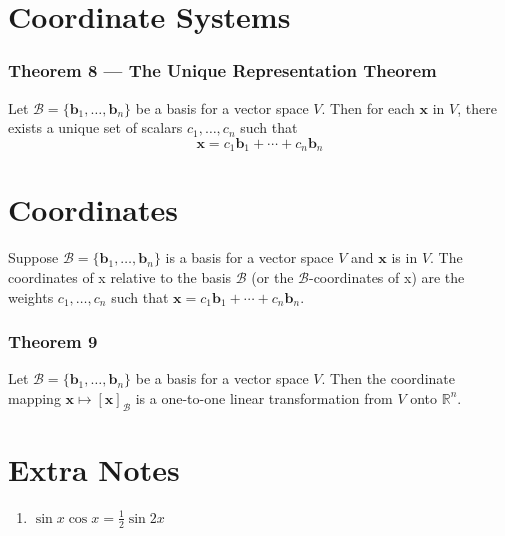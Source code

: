 \documentclass{article}
\begin{document}
\section*{Coordinate Systems}
\subsubsection*{Theorem 8 --- The Unique Representation Theorem}
Let $\mathcal{B}=\{\mathbf{b}_1, \ldots, \mathbf{b}_n\}$ be a basis for a vector space $V$. Then for each $\mathbf{x}$ in $V$, there exists a unique set of scalars $c_1, \ldots, c_n$ such that
\[\mathbf{x}=c_1\mathbf{b}_1 + \cdots + c_n\mathbf{b}_n\]

\section*{Coordinates}
Suppose $\mathcal{B}=\{\mathbf{b}_1, \ldots, \mathbf{b}_n\}$ is a basis for a vector space $V$ and $\mathbf{x}$ is in $V$. The coordinates of x relative to the basis $\mathcal{B}$ (or the $\mathcal{B}$-coordinates of x) are the weights $c_1, \dots, c_n$ such that $\mathbf{x}=c_1\mathbf{b}_1 + \cdots + c_n\mathbf{b}_n$.

\subsubsection*{Theorem 9}
Let $\mathcal{B} = \{\mathbf{b}_1, \ldots, \mathbf{b}_n\}$ be a basis for a vector space $V$. Then the coordinate mapping $\mathbf{x} \mapsto \left[ \mathbf{x} \right]_{\mathcal{B}}$ is a one-to-one linear transformation from $V$ onto $\mathbb{R}^n$. 
\section*{Extra Notes}
\begin{enumerate}
    \item $\sin x \cos x = \frac{1}{2} \sin 2x$
\end{enumerate}
\end{document}
